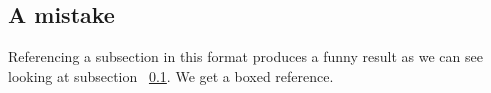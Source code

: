 \documentclass{article}
\begin{document}
  \subsection{A mistake}\label{wrong}
  Referencing a subsection in this format produces
  a funny result as we can see looking at
  subsection ~\ref{wrong}.
  We get a boxed reference.
\end{document}
